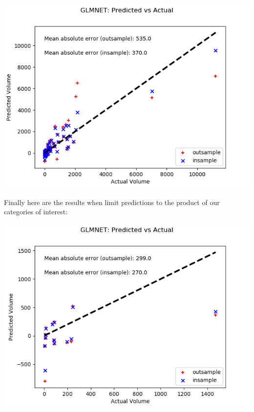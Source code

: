 \documentclass[12pt,a4paper,leqno]{report}
\theoremstyle{plain}
\theoremstyle{definition}
\theoremstyle{remark}
\begin{document}
\bigskip
{
    \centering
    \includegraphics[width=\textwidth,height=\textheight,keepaspectratio]{predictions_final_glmnet.png}
    \par
}
\bigskip

Finally here are the results when limit predictions to the product
of our categories of interest:

\bigskip
{
    \centering
    \includegraphics[width=\textwidth,height=\textheight,keepaspectratio]{predictions_final_lim_pred_glmnet.png}
    \par
}
\bigskip
\end{document}
